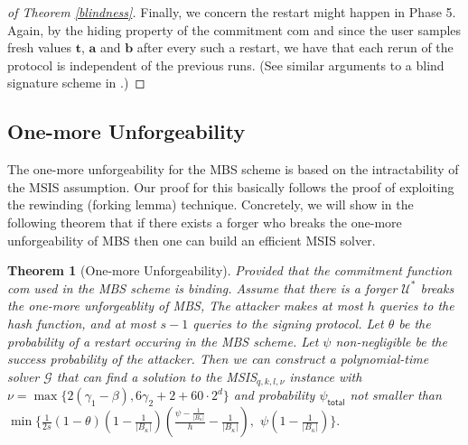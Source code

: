 \documentclass[conference]{IEEEtran}
\newtheorem{theorem}{Theorem}[section]
\newtheorem{proof}{Proof}
\begin{document}
\begin{proof}[of Theorem \ref{blindness}]
		Finally, we concern the restart might happen in Phase 5. Again, by the hiding property of the commitment \textsf{com} and since the user samples fresh values $\mathbf{t}$, $\mathbf{a}$ and $\mathbf{b}$ after every such a restart, we have that each rerun of the protocol is independent of the previous runs. (See similar arguments to a blind signature scheme in \cite{Ruc10}.)
		\fi
		
	\end{proof}
	
	
	\subsection{One-more Unforgeability}
	The one-more unforgeability for the \textsf{MBS} scheme is based on the intractability of the \textsf{MSIS} assumption. Our proof for this basically follows the proof of \cite[Theorem 3.8]{Ruc10} exploiting the rewinding (forking lemma) technique. Concretely, we will show in the following theorem that if there exists a  forger who breaks the one-more unforgeability of \textsf{MBS} then one can build an efficient \textsf{MSIS} solver.
	\begin{theorem}[One-more Unforgeability] \label{theo1}
		Provided that the commitment function  \textsf{com} used in the \textsf{MBS} scheme is binding. Assume that there is a forger $\mathcal{U}^*$ breaks the one-more unforgeablity of \textsf{MBS}, The attacker makes at most $h$ queries to the hash function, and at most $s-1$ queries to the signing protocol. Let $\theta$ be the probability of a restart occuring in the \textsf{MBS} scheme. Let $\psi$ non-negligible be the success probability of the attacker. Then we can construct a polynomial-time solver $\mathcal{G}$ that can find a solution to the \textsf{MSIS}$_{q,k, l, \nu}$ instance with $\nu=\max\{2(\gamma_1-\beta), 6\gamma_2+2+60 \cdot 2^d\}$ and probability $	\psi_{\textsf{total}}$ not smaller than 
	$\min \{ \frac{1}{2s}(1-\theta)\left(1-\frac{1}{|B_{\kappa}|}\right)\left(\frac{\psi-\frac{1}{|B_{\kappa}|}}{h}-\frac{1}{|B_{\kappa}|}\right),$ $ \psi\left(1-\frac{1}{|B_{\kappa}|}\right) \}.$
	
	\end{theorem}
	
	
	
\end{document}
